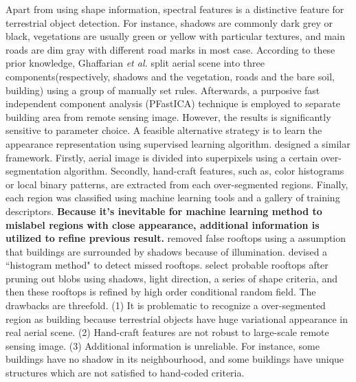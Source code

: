 \documentclass[runningheads]{llncs}
\begin{document}
   Apart from using shape information, spectral features is a distinctive feature for  terrestrial object detection. For instance, shadows are commonly dark grey or black, vegetations are usually green or yellow with particular textures, and main roads are dim gray with different road marks in most case. According to these prior knowledge, Ghaffarian \textit{et al.} \cite{ghaffarian2014automaticPFICA} split aerial scene into three components(respectively, shadows and the vegetation, roads and the bare soil, building) using a group of manually set rules. Afterwards, a purposive fast independent component analysis (PFastICA) technique is employed to separate building area from remote sensing image. However, the results is significantly sensitive to parameter choice. A feasible alternative strategy is to learn the appearance representation using  supervised learning algorithm. \cite{chen2014shadow}\cite{dornaika2015object}\cite{baluyan2013novel}\cite{ngoautomatic} designed a similar framework. Firstly, aerial image is divided into superpixels using  a certain over-segmentation algorithm. Secondly, hand-craft features, such as, color histograms or local binary patterns, are extracted from each over-segmented regions. Finally, each region was classified using machine learning tools and a gallery of training descriptors. \textbf{ Because it's inevitable for machine learning method to mislabel regions with close appearance, additional information is utilized to refine previous result.} \cite{ngoautomatic} removed false rooftops using a assumption that buildings are surrounded by shadows because of illumination. \cite{baluyan2013novel} devised a ``histogram method" to detect missed rooftops. \cite{li2015robust} select probable rooftops after pruning out blobs using shadows, light direction, a series of shape criteria, and then these rooftops is refined by high order conditional random field. The drawbacks are threefold. (1) It is problematic to recognize a over-segmented region as building because terrestrial objects have huge variational appearance in real aerial scene. (2) Hand-craft features are not robust to large-scale remote sensing image. (3) Additional information is unreliable. For instance, some buildings have no shadow in its neighbourhood, and some buildings have unique structures which are not satisfied to hand-coded criteria. 
\end{document}
